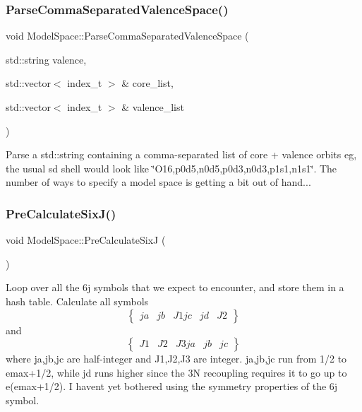 \subsubsection{\texorpdfstring{Parse\+Comma\+Separated\+Valence\+Space()}{ParseCommaSeparatedValenceSpace()}}
{\footnotesize\ttfamily void Model\+Space\+::\+Parse\+Comma\+Separated\+Valence\+Space (\begin{DoxyParamCaption}\item[{std\+::string}]{valence,  }\item[{std\+::vector$<$ index\+\_\+t $>$ \&}]{core\+\_\+list,  }\item[{std\+::vector$<$ index\+\_\+t $>$ \&}]{valence\+\_\+list }\end{DoxyParamCaption})}

Parse a std\+::string containing a comma-\/separated list of core + valence orbits eg, the usual sd shell would look like \char`\"{}\+O16,p0d5,n0d5,p0d3,n0d3,p1s1,n1s1\char`\"{}. The number of ways to specify a model space is getting a bit out of hand... \mbox{\label{classModelSpace_abd5c59215d553bd2db47120d2db4b2ea}} 
\subsubsection{\texorpdfstring{Pre\+Calculate\+Six\+J()}{PreCalculateSixJ()}}
{\footnotesize\ttfamily void Model\+Space\+::\+Pre\+Calculate\+SixJ (\begin{DoxyParamCaption}{ }\end{DoxyParamCaption})}

Loop over all the 6j symbols that we expect to encounter, and store them in a hash table. Calculate all symbols \[ \begin{Bmatrix} ja & jb & J1 jc & jd & J2 \end{Bmatrix} \] and \[ \begin{Bmatrix} J1 & J2 & J3 ja & jb & jc \end{Bmatrix} \] where ja,jb,jc are half-\/integer and J1,J2,J3 are integer. ja,jb,jc run from 1/2 to emax+1/2, while jd runs higher since the 3N recoupling requires it to go up to e(emax+1/2). I haven\textquotesingle{}t yet bothered using the symmetry properties of the 6j symbol. \mbox{\label{classModelSpace_a3354ef5c4dbcae5786759696ab500951}} 
